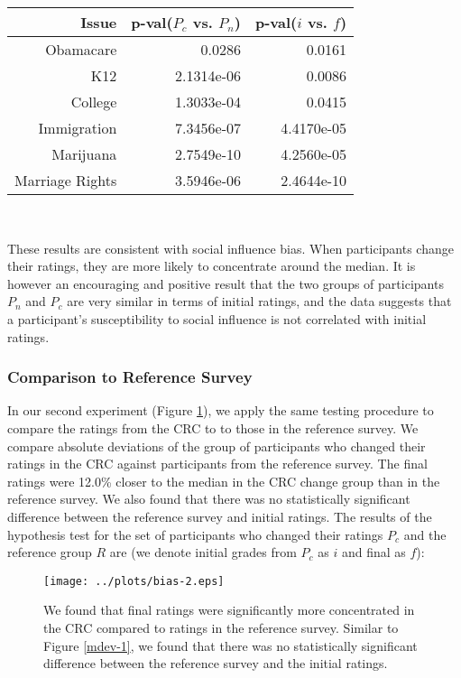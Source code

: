 {\centering
\scriptsize
\begin{tabular}[!ht] { r | r | r }
\label{dev-2}
  Issue & p-val($P_c$ vs. $P_n$) & p-val($i$ vs. $f$) \\
  \hline
  \hline
  Obamacare &  0.0286 & 0.0161 \\
  \hline
  K12 & 2.1314e-06 &  0.0086 \\
  \hline
  College & 1.3033e-04 & 0.0415 \\
  \hline
  Immigration & 7.3456e-07 &4.4170e-05\\
  \hline
  Marijuana & 2.7549e-10 & 4.2560e-05\\
  \hline
  Marriage Rights & 3.5946e-06 & 2.4644e-10 \\
\end{tabular}\\[1\baselineskip]
}

These results are consistent with social influence bias.
When participants change their ratings, they are more likely to concentrate around the median.
It is however an encouraging and positive result that the two groups of participants $P_n$ and $P_c$ are very similar in terms of initial ratings, and the data suggests that a participant's susceptibility to social influence is not correlated with initial ratings.

\subsubsection{Comparison to Reference Survey}
In our second experiment (Figure \ref{mdev-2}), we apply the same testing procedure to compare the ratings from the CRC to to those in the reference survey.
We compare absolute deviations of the group of participants who changed their ratings in the CRC against participants from the reference survey.
The final ratings were 12.0\% closer to the median in the CRC change group than in the reference survey.
We also found that there was no statistically significant difference between the reference survey and initial ratings.
The results of the hypothesis test for the set of participants who changed their ratings $P_c$ and the reference group $R$ are (we denote initial grades from $P_c$ as $i$ and final as $f$):
\begin{figure}[h]
\centering
    \texttt{[image: ../plots/bias-2.eps]}
      \caption{We found that final ratings were significantly more concentrated in the CRC compared to ratings in the reference survey. Similar to Figure \ref{mdev-1}, we found that there was no statistically significant difference between the reference survey and the initial ratings.}
      \label{mdev-2}
\end{figure}

